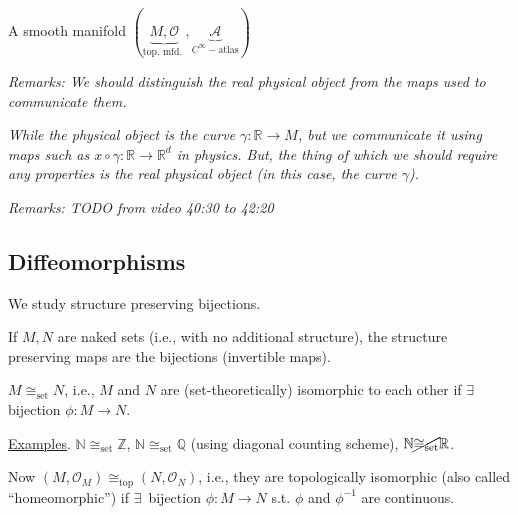 \begin{definition}
  A smooth manifold $(\underbrace{ M,\mathcal{O} }_{\text{top. mfd. } }, \underbrace{ \mathcal{A}}_{C^{\infty}-\text{atlas}} )$ 
\end{definition}

\textit{Remarks: We should distinguish the real physical object from the maps used to communicate them.}

\textit{While the physical object is the curve $\gamma : \mathbb{R} \to M$, but we communicate it using maps such as $x \circ \gamma : \mathbb{R} \to \mathbb{R}^d$ in physics. But, the thing of which we should require any properties is the real physical object (in this case, the curve $\gamma$).}

\textit{Remarks: TODO from video 40:30 to 42:20}

\subsection{Diffeomorphisms}

We study structure preserving bijections.

If $M,N$ are naked sets (i.e., with no additional structure), the structure preserving maps are the bijections (invertible maps).  

\begin{definition}
  $M \cong_{\text{set}} N$, i.e., $M$ and $N$ are (set-theoretically) isomorphic to each other if $\exists \, $ bijection $\phi : M \to N$.
\end{definition}

\underline{Examples}.  $\mathbb{N} \cong_{\text{set}} \mathbb{Z}$, $\mathbb{N} \cong_{\text{set}} \mathbb{Q}$  (using diagonal counting scheme), $\mathbb{N} \cancel{\cong_{\text{set}}} \mathbb{R}$.

Now $(M, \mathcal{O}_M) \cong_{\text{top}} (N,\mathcal{O}_N)$, i.e., they are topologically isomorphic (also called ``homeomorphic'') if $\exists \, $ bijection $\phi : M \to N$  s.t. $\phi$ and $\phi^{-1}$ are continuous.  

